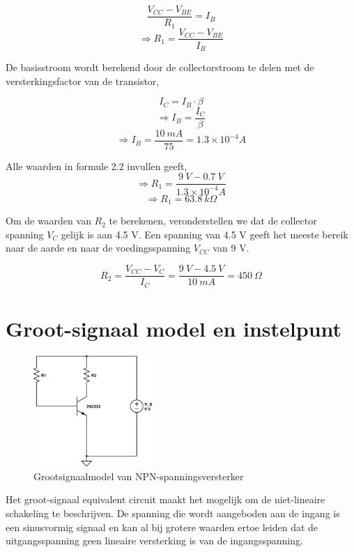 \documentclass{report}
\begin{document}
\begin{equation}
\frac{V_{CC}-V_{BE}}{R_1}=I_B 
\end{equation}
$$\Rightarrow R_1=\frac{V_{CC}-V_{BE}}{I_B}$$

\noindent De basisstroom wordt berekend door de collectorstroom te delen met de versterkingsfactor van de transistor,

\begin{equation}
I_C=I_B \cdot \beta
\end{equation}
$$\Rightarrow I_B=\frac{I_C}{\beta}$$
$$\Rightarrow I_B=\frac{10 \: mA}{75}=1.3\times 10^{-4}A$$

\noindent Alle waarden in formule 2.2 invullen geeft,
$$\Rightarrow R_1=\frac{9\: V-0.7\: V}{1.3\times 10^{-4}A}$$
$$\Rightarrow R_1=63.8 \: k  \Omega$$

\noindent Om de waarden van $R_2$ te berekenen, veronderstellen we dat de collector spanning $V_C$ gelijk is aan 4.5 V. Een spanning van 4.5 V geeft het meeste bereik naar de aarde en naar de voedingsspanning $V_{CC}$ van 9 V. 

$$R_2 = \frac{V_{CC}-V_C}{I_C} = \frac{9\:V-4.5\:V}{10\:mA}=450\: \Omega$$

\chapter{Groot-signaal model en instelpunt}

\begin{figure}
	\centering
	\label{fig:npn-amplifier-grootsignaal}
	\includegraphics[width=0.4\textwidth]{resource/npn-grootsignaal-versterker}
	\caption{Grootsignaalmodel van NPN-spanningsversterker}
\end{figure}

Het groot-signaal equivalent circuit maakt het mogelijk om de niet-lineaire schakeling te beschrijven. De spanning die wordt aangeboden aan de ingang is een sinusvormig signaal en kan al bij grotere waarden ertoe leiden dat de uitgangsspanning geen lineaire versterking is van de ingangsspanning.
\end{document}
